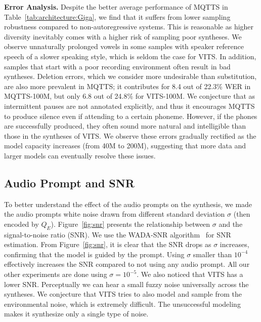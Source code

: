 \documentclass[letterpaper]{article}
\begin{document}
\textbf{Error Analysis.}
Despite the better average performance of MQTTS in Table~\ref{tab:architecture:Giga}, we find that it suffers from lower sampling robustness compared to non-autoregressive systems.
This is reasonable as higher diversity inevitably comes with a higher risk of sampling poor syntheses.
We observe unnaturally prolonged vowels in some samples with speaker reference speech of a slower speaking style, which is seldom the case for VITS.
In addition, samples that start with a poor recording environment often result in bad syntheses.
Deletion errors, which we consider more undesirable than substitution, are also more prevalent in MQTTS; it contributes for 8.4 out of 22.3\% WER in MQTTS-100M, but only 6.8 out of 24.8\% for VITS-100M.
We conjecture that as intermittent pauses are not annotated explicitly, and thus it encourages MQTTS to produce silence even if attending to a certain phoneme.
However, if the phones are successfully produced, they often sound more natural and intelligible than those in the syntheses of VITS.
We observe these errors gradually rectified as the model capacity increases (from 40M to 200M), suggesting that more data and larger models can eventually resolve these issues.






\subsection{Audio Prompt and SNR}
To better understand the effect of the audio prompts on the synthesis, we made the audio prompts white noise drawn from different standard deviation $\sigma$ (then encoded by $Q_E$).
Figure~\ref{fig:snr} presents the relationship between $\sigma$ and the signal-to-noise ratio (SNR).
We use the WADA-SNR algorithm~\cite{kim08e_interspeech} for SNR estimation.
From Figure~\ref{fig:snr}, it is clear that the SNR drops as $\sigma$ increases, confirming that the model is guided by the prompt.
Using $\sigma$ smaller than $10^{-4}$  effectively increases the SNR compared to not using any audio prompt.
All our other experiments are done using $\sigma=10^{-5}$.
We also noticed that VITS has a lower SNR.
Perceptually we can hear a small fuzzy noise universally across the syntheses.
We conjecture that VITS tries to also model and sample from the environmental noise, which is extremely difficult.
The unsuccessful modeling makes it synthesize only a single type of noise.
\end{document}
